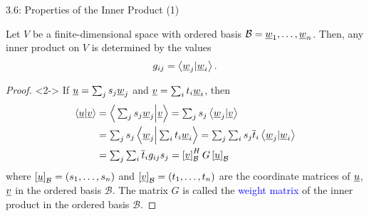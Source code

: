 \documentclass[10pt,letterpaper,english]{beamer}
\begin{document}
\begin{frame}{3.6: Properties of the Inner Product (1)}

\begin{theorem}
Let $V$ be a finite-dimensional space with ordered basis $\mathcal{B} = \underline{w}_1, \ldots, \underline{w}_n$.
Then, any inner product on $V$ is determined by the values \vspace{-1,5mm}
\begin{equation*}
g_{ij} = \left\langle \underline{w}_j | \underline{w}_i \right\rangle.
\end{equation*}
\end{theorem}

\begin{proof}<2->
If $\underline{u} = \sum_{j} s_j \underline{w}_j$ and $\underline{v} = \sum_{i} t_i \underline{w}_i$, then \vspace{-1.5mm}
\begin{equation*}
\begin{split}
\left\langle \underline{u} | \underline{v} \right\rangle
&= \Big\langle \textstyle\sum_{j} s_j \underline{w}_j \Big| \underline{v} \Big\rangle
= \textstyle\sum_{j} s_j \left\langle \underline{w}_j | \underline{v} \right\rangle \\
&= \textstyle\sum_{j} s_j \left\langle \underline{w}_j \Big| \textstyle\sum_{i} t_i \underline{w}_i \right\rangle
= \textstyle\sum_{j} \textstyle\sum_{i} s_j \overline{t}_i \left\langle \underline{w}_j | \underline{w}_i \right\rangle \\
&= \textstyle\sum_{j} \textstyle\sum_{i} \overline{t}_i g_{ij} s_j
= \left[ \underline{v} \right]_{\mathcal{B}}^H G \left[ \underline{u} \right]_{\mathcal{B}}
\end{split}
\end{equation*}
where $\left[ \underline{u} \right]_{\mathcal{B}} = (s_1,\ldots,s_n)$ and $\left[ \underline{v} \right]_{\mathcal{B}} = (t_1,\ldots,t_n)$ are the coordinate matrices of $\underline{u}$, $\underline{v}$ in the ordered basis $\mathcal{B}$.
The matrix $G$ is called the \textcolor{blue}{weight matrix} of the inner product in the ordered basis $\mathcal{B}$.
\end{proof}

\end{frame}
\end{document}

